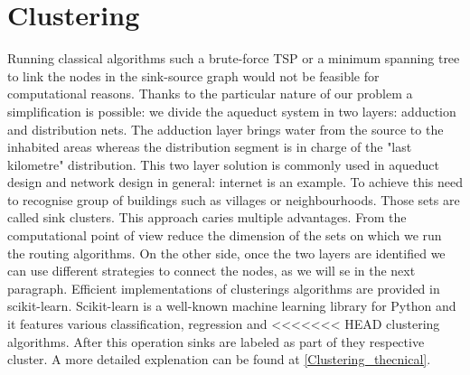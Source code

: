 \section{Clustering}
Running classical algorithms such a brute-force TSP or a minimum spanning tree to link
the nodes in the sink-source graph would not be feasible for computational reasons. 
Thanks to the particular nature of our problem a simplification is possible: we divide the aqueduct system
in two layers: adduction and distribution nets. The adduction layer brings water from the
source to the inhabited areas whereas the distribution segment is in charge of the "last
kilometre" distribution. This two layer solution is commonly used in aqueduct design and
network design in general: internet is an example.
To achieve this need to recognise group of buildings such as villages or neighbourhoods. Those sets are called sink clusters.
This approach caries multiple advantages. From the computational point of view reduce the dimension of the sets on which we run the routing algorithms.  On the other side, once the two layers are identified we can use different strategies to connect the nodes, as we will se in the next paragraph.
Efficient implementations of clusterings algorithms are provided in scikit-learn. Scikit-learn is a well-known
machine learning library for Python and it features various classification, regression and
<<<<<<< HEAD
clustering algorithms. After this operation sinks are labeled as part of they respective cluster. 
A more detailed explenation can be found at \ref {Clustering_thecnical}.

